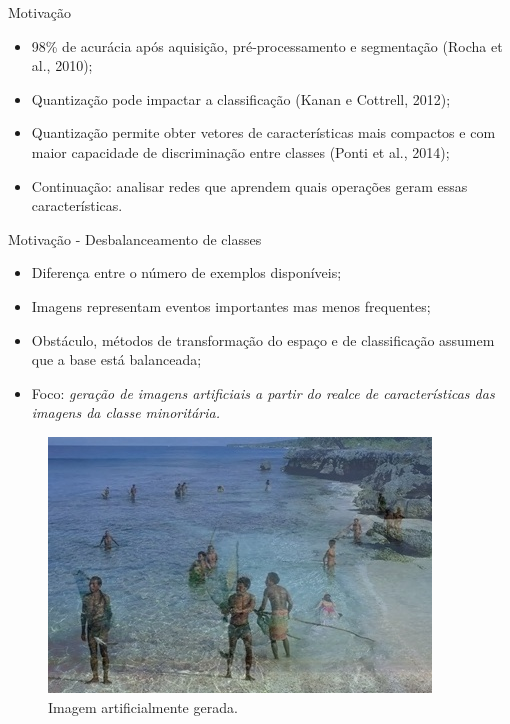 \documentclass{beamer}
\begin{document}
\begin{frame}{Motivação}
\setlength\leftmargini{0em}
\justifying
  \begin{itemize}
\justifying
    \item 98\% de acurácia após aquisição, pré-processamento e segmentação (Rocha et al., 2010); %
    \item Quantização pode impactar a classificação (Kanan e Cottrell, 2012);
    \item Quantização permite obter vetores de características mais compactos e com maior capacidade de discriminação entre classes (Ponti et al., 2014);
    \item[]  {Continuação: analisar redes que aprendem quais operações geram essas características.}
  \end{itemize}
\end{frame}
\begin{frame}{Motivação - Desbalanceamento de classes}
\setlength\leftmargini{0em}
\justifying
  \begin{itemize}
    \item Diferença entre o número de exemplos disponíveis;
    \item Imagens representam eventos importantes mas menos frequentes;
    \item Obstáculo, métodos de transformação do espaço e de 
    classificação assumem que a base está balanceada;
    \item Foco: \emph{geração de imagens artificiais a partir do realce de características das imagens da classe minoritária.}
  \end{itemize}
  \begin{figure}[htbp]
 \begin{center}
   \includegraphics[width=.4\linewidth]{figuras/imagemgerada.jpg}
 \caption{Imagem artificialmente gerada.}
 \end{center}
\end{figure}

\end{frame}
\end{document}
